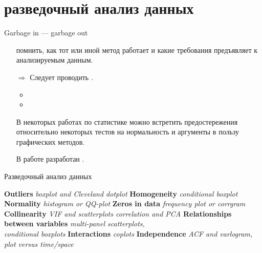 \section{разведочный анализ данных}
\begin{frame}{Garbage in — garbage out}
\begin{itemize}
\mytem Данные получить \textbf{\color{red!13!blue}{легко}}.
\mytem Скормить полученное компьютеру \textbf{\color{red!13!blue}{тоже легко}}. \pause
\item[\texttt{\symbol{"1F63F}}] \textbf{\color{red!13!blue}{Тяжело}} помнить, как тот или иной метод работает и какие требования предъявляет к анализируемым данным.\bigskip \pause
\item[$\Rightarrow$] Следует проводить \textbf{\color{red!13!blue}{разведочный анализ данных}}. \pause
\begin{itemize}
\item \color{red!13!blue}{визуализация}
\item {\color{red!13!blue}{формальные статистические тесты}}
\end{itemize}
В некоторых работах по статистике можно встретить предостережения относительно некоторых тестов на нормальность и аргументы в пользу графических методов. \bigskip \pause
\item[] В работе \citep{zuur10} разработан \textbf{\color{red!13!blue}{протокол разведочного анализа данных}}.
\end{itemize}
\end{frame}
\begin{frame}{Разведочный анализ данных \citep{zuur10}}
\begin{itemize}
\mytem \textbf{Outliers} \hfill \textit{boxplot and Cleveland dotplot}
\mytem \textbf{Homogeneity} \hfill \textit{conditional boxplot}
\mytem \textbf{Normality} \hfill \textit{histogram or QQ-plot}
\mytem \textbf{Zeros in data} \hfill \textit{frequency plot or corrgram}
\mytem \textbf{Collinearity} \hfill \textit{VIF and scatterplots correlation and PCA}
\mytem \textbf{Relationships between variables} \hfill \textit{multi-panel scatterplots, \\ \hfill conditional boxplots}
\mytem \textbf{Interactions} \hfill \textit{coplots}
\mytem \textbf{Independence} \hfill \textit{ACF and varlogram, plot versus time/space}
\end{itemize}
\end{frame}
